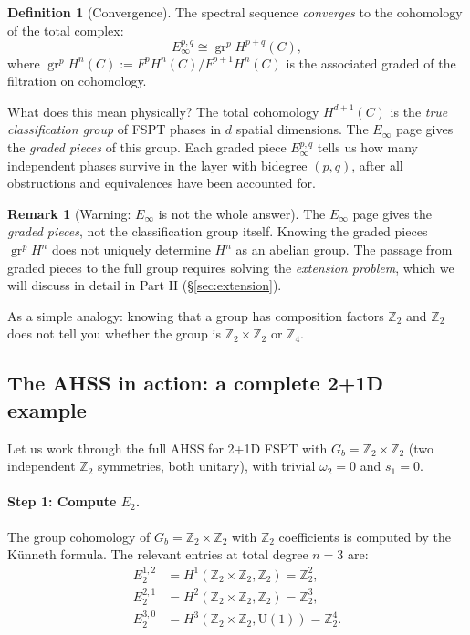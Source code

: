 \documentclass{SciPost}
\theoremstyle{definition}
\newtheorem{definition}[theorem]{Definition}
\newtheorem{remark}[theorem]{Remark}
\newcommand{\Zt}{\mathbb{Z}_2}
\newcommand{\Zn}[1]{\mathbb{Z}_{#1}}
\newcommand{\U}{\mathrm{U}}
\newcommand{\Gb}{G_b}
\newcommand{\gr}{\operatorname{gr}}
\begin{document}
\begin{definition}[Convergence]
The spectral sequence \emph{converges} to the cohomology of the total complex:
\begin{equation}
\label{eq:convergence}
E_\infty^{p,q} \cong \gr^p H^{p+q}(C),
\end{equation}
where $\gr^p H^n(C) := F^p H^n(C) / F^{p+1} H^n(C)$ is the associated graded of the filtration on cohomology.
\end{definition}

What does this mean physically?
The total cohomology $H^{d+1}(C)$ is the \emph{true classification group} of FSPT phases in $d$ spatial dimensions.
The $E_\infty$ page gives the \emph{graded pieces} of this group.
Each graded piece $E_\infty^{p,q}$ tells us how many independent phases survive in the layer with bidegree $(p,q)$, after all obstructions and equivalences have been accounted for.

\begin{remark}[Warning: $E_\infty$ is not the whole answer]
\label{rem:Einfty-warning}
The $E_\infty$ page gives the \emph{graded pieces}, not the classification group itself.
Knowing the graded pieces $\gr^p H^n$ does not uniquely determine $H^n$ as an abelian group.
The passage from graded pieces to the full group requires solving the \emph{extension problem}, which we will discuss in detail in Part II (\S\ref{sec:extension}).

As a simple analogy: knowing that a group has composition factors $\Zt$ and $\Zt$ does not tell you whether the group is $\Zt \times \Zt$ or $\Zn{4}$.
\end{remark}


\subsection{The AHSS in action: a complete 2+1D example}
\label{subsec:AHSS-example}

Let us work through the full AHSS for 2+1D FSPT with $\Gb = \Zt \times \Zt$ (two independent $\Zt$ symmetries, both unitary), with trivial $\omega_2 = 0$ and $s_1 = 0$.

\paragraph{Step 1: Compute $E_2$.}
The group cohomology of $\Gb = \Zt \times \Zt$ with $\Zt$ coefficients is computed by the Künneth formula.
The relevant entries at total degree $n = 3$ are:
\begin{align}
E_2^{1,2} &= H^1(\Zt \times \Zt, \Zt) = \Zt^2, \\
E_2^{2,1} &= H^2(\Zt \times \Zt, \Zt) = \Zt^3, \\
E_2^{3,0} &= H^3(\Zt \times \Zt, \U(1)) = \Zt^4.
\end{align}
\end{document}
